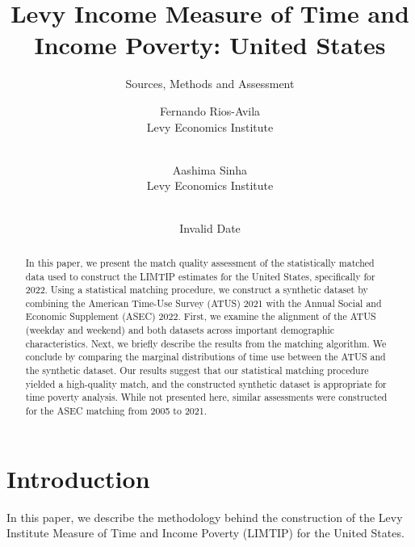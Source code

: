 \documentclass[
  11pt,
]{article}
\title{Levy Income Measure of Time and Income Poverty: United States}
\subtitle{Sources, Methods and Assessment}
\author{
Fernando Rios-Avila\\
Levy Economics Institute\\
\\
\and 
Aashima Sinha\\
Levy Economics Institute\\
\\
}
\date{Invalid Date}
\begin{document}
\def\spacingset#1{\renewcommand{\baselinestretch}%
{#1}\small\normalsize} \spacingset{1}


\maketitle
\begin{abstract}
In this paper, we present the match quality assessment of the
statistically matched data used to construct the LIMTIP estimates for
the United States, specifically for 2022. Using a statistical matching
procedure, we construct a synthetic dataset by combining the American
Time-Use Survey (ATUS) 2021 with the Annual Social and Economic
Supplement (ASEC) 2022. First, we examine the alignment of the ATUS
(weekday and weekend) and both datasets across important demographic
characteristics. Next, we briefly describe the results from the matching
algorithm. We conclude by comparing the marginal distributions of time
use between the ATUS and the synthetic dataset. Our results suggest that
our statistical matching procedure yielded a high-quality match, and the
constructed synthetic dataset is appropriate for time poverty analysis.
While not presented here, similar assessments were constructed for the
ASEC matching from 2005 to 2021.
\end{abstract}
 
\vspace{.2in}

\setcounter{tocdepth}{2}



\thispagestyle{empty}
\clearpage{}
\newpage
\spacingset{1.2} %
\section{Introduction}\label{introduction}

In this paper, we describe the methodology behind the construction of
the Levy Institute Measure of Time and Income Poverty (LIMTIP) for the
United States.
\end{document}
